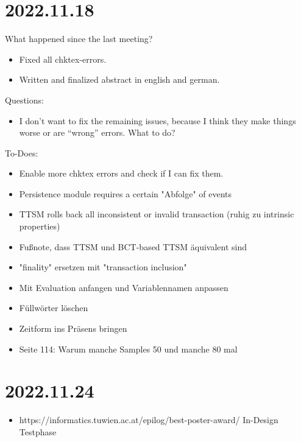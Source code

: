 \section{2022.11.18}
What happened since the last meeting?
\begin{itemize}
    \item Fixed all chktex-errors.
    \item Written and finalized abstract in english and german.
\end{itemize}

Questions:
\begin{itemize}
    \item I don't want to fix the remaining issues, because I think they make things worse or are ``wrong'' errors. What to do?
\end{itemize}

To-Does:
\begin{itemize}
    \item Enable more chktex errors and check if I can fix them.
    \item Persistence module requires a certain "Abfolge" of events
    \item TTSM rolls back all inconsistent or invalid transaction (ruhig zu intrinsic properties)
    \item Fußnote, dass TTSM und BCT-based TTSM äquivalent sind
    \item "finality" ersetzen mit "transaction inclusion"
    \item Mit Evaluation anfangen und Variablennamen anpassen
    \item Füllwörter löschen
    \item Zeitform ins Präsens bringen
    \item Seite 114: Warum manche Samples 50 und manche 80 mal
\end{itemize}


\section{2022.11.24}
\begin{itemize}
    \item https://informatics.tuwien.ac.at/epilog/best-poster-award/ In-Design Testphase
\end{itemize}
